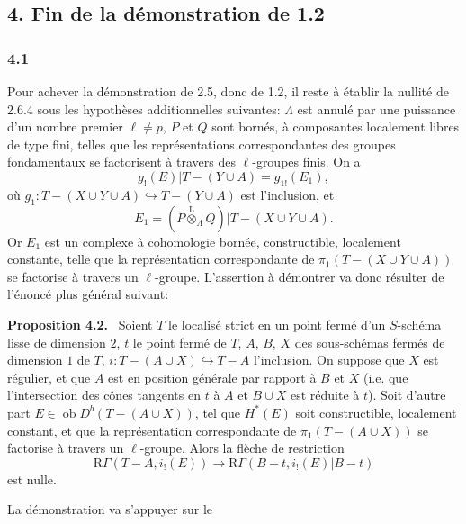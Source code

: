 \documentclass[11pt]{article}
\newenvironment{statement}[1]{\par\medskip\noindent\textbf{#1.}\ }{\par\medskip}
\providecommand{\lten}{\overset{\mathrm L}{\otimes}}
\providecommand{\Ob}{\operatorname{ob}}
\providecommand{\lten}{\overset{\mathrm L}{\otimes}}
\providecommand{\lten}{\overset{\mathrm L}{\otimes}}
\providecommand{\Ob}{\operatorname{ob}}
\providecommand{\lten}{\overset{\mathrm L}{\otimes}}
\providecommand{\lten}{\overset{\mathrm L}{\otimes}}
\providecommand{\Ob}{\operatorname{Ob}}
\providecommand{\lten}{\overset{\mathrm L}{\otimes}}
\begin{document}
\subsection*{4. Fin de la démonstration de 1.2}

\subsubsection*{4.1}
Pour achever la démonstration de 2.5, donc de 1.2, il reste à établir la nullité de 2.6.4 sous les hypothèses additionnelles suivantes: $\Lambda$ est annulé par une puissance d'un nombre premier $\ell\ne p$, $P$ et $Q$ sont bornés, à composantes localement libres de type fini, telles que les représentations correspondantes des groupes fondamentaux se factorisent à travers des $\ell$-groupes finis. On a
\[
g_!(E)|T-(Y\cup A)=g_{1!}(E_1),
\]
où $g_1:T-(X\cup Y\cup A)\hookrightarrow T-(Y\cup A)$ est l'inclusion, et
\[
E_1=(P\lten_{\Lambda}Q)|T-(X\cup Y\cup A).
\]
Or $E_1$ est un complexe à cohomologie bornée, constructible, localement constante, telle que la représentation correspondante de $\pi_1(T-(X\cup Y\cup A))$ se factorise à travers un $\ell$-groupe. L'assertion à démontrer va donc résulter de l'énoncé plus général suivant:

\begin{statement}{Proposition 4.2}
Soient $T$ le localisé strict en un point fermé d'un $S$-schéma lisse de dimension $2$, $t$ le point fermé de $T$, $A$, $B$, $X$ des sous-schémas fermés de dimension $1$ de $T$, $i:T-(A\cup X)\hookrightarrow T-A$ l'inclusion. On suppose que $X$ est régulier, et que $A$ est en position générale par rapport à $B$ et $X$ (i.e. que l'intersection des cônes tangents en $t$ à $A$ et $B\cup X$ est réduite à $t$). Soit d'autre part $E\in\Ob D^b(T-(A\cup X))$, tel que $H^*(E)$ soit constructible, localement constant, et que la représentation correspondante de $\pi_1(T-(A\cup X))$ se factorise à travers un $\ell$-groupe. Alors la flèche de restriction
\[
\mathrm R\Gamma(T-A,i_!(E))
\longrightarrow
\mathrm R\Gamma(B-t,i_!(E)|B-t)
\]
est nulle.
\end{statement}

La démonstration va s'appuyer sur le
\end{document}
